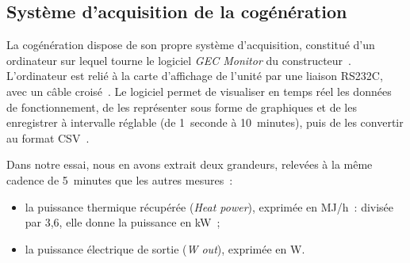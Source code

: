 \subsection{Système d'acquisition de la cogénération}
\label{subsec:acquisition}

La cogénération dispose de son propre système d'acquisition, constitué d'un ordinateur sur lequel tourne le logiciel \emph{GEC Monitor} du constructeur~\cite{acq}. L'ordinateur est relié à la carte d'affichage de l'unité par une liaison RS232C, avec un câble croisé~\cite{acq}. Le logiciel permet de visualiser en temps réel les données de fonctionnement, de les représenter sous forme de graphiques et de les enregistrer à intervalle réglable (de 1~seconde à 10~minutes), puis de les convertir au format CSV~\cite{acq}.

Dans notre essai, nous en avons extrait deux grandeurs, relevées à la même cadence de 5~minutes que les autres mesures~:
\begin{itemize}
  \item la puissance thermique récupérée (\emph{Heat power}), exprimée en MJ/h~: divisée par 3,6, elle donne la puissance en kW~;
  \item la puissance électrique de sortie (\emph{W out}), exprimée en W.
\end{itemize}
